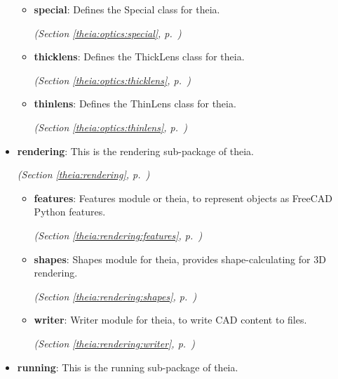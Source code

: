 \begin{itemize}
\begin{itemize}
    \item \textbf{special}: Defines the Special class for theia.



  \textit{(Section \ref{theia:optics:special}, p.~\pageref{theia:optics:special})}

    \item \textbf{thicklens}: Defines the ThickLens class for theia.



  \textit{(Section \ref{theia:optics:thicklens}, p.~\pageref{theia:optics:thicklens})}

    \item \textbf{thinlens}: Defines the ThinLens class for theia.



  \textit{(Section \ref{theia:optics:thinlens}, p.~\pageref{theia:optics:thinlens})}

  \end{itemize}
\item \textbf{rendering}: This is the rendering sub-package of theia.



  \textit{(Section \ref{theia:rendering}, p.~\pageref{theia:rendering})}

  \begin{itemize}
\setlength{\parskip}{0ex}
    \item \textbf{features}: Features module or theia, to represent objects as FreeCAD Python features.



  \textit{(Section \ref{theia:rendering:features}, p.~\pageref{theia:rendering:features})}

    \item \textbf{shapes}: Shapes module for theia, provides shape-calculating for 3D rendering.



  \textit{(Section \ref{theia:rendering:shapes}, p.~\pageref{theia:rendering:shapes})}

    \item \textbf{writer}: Writer module for theia, to write CAD content to files.



  \textit{(Section \ref{theia:rendering:writer}, p.~\pageref{theia:rendering:writer})}

  \end{itemize}
\item \textbf{running}: This is the running sub-package of theia.




\end{itemize}
